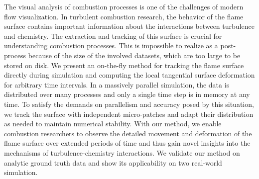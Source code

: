 
%
The visual analysis of combustion processes is one of the challenges of modern
flow visualization.
%
In turbulent combustion research, the behavior of the flame surface contains
important information about the interactions between turbulence and chemistry.
%
The extraction and tracking of this surface is crucial for understanding
combustion processes.
%
This is impossible to realize as a post-process because of the size of the
involved datasets, which are too large to be stored on disk.
%
%
We present an on-the-fly method for tracking the flame surface directly during
simulation and computing the local tangential surface deformation for arbitrary
time intervals.
%
In a massively parallel simulation, the data is distributed over many processes
and only a single time step is in memory at any time.
%
To satisfy the demands on parallelism and accuracy posed by this situation, we
track the surface with independent micro-patches and adapt their distribution as
needed to maintain numerical stability.
%
%
%
With our method, we enable combustion researchers to observe the detailed
movement and deformation of the flame surface over extended periods of time and
thus gain novel insights into the mechanisms of turbulence-chemistry
interactions.
%
We validate our method on analytic ground truth data and show its applicability
on two real-world simulation.
